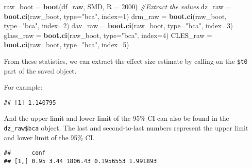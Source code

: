 \documentclass[]{tufte-handout}
\newenvironment{Shaded}{}{}
\newcommand{\CommentTok}[1]{\textcolor[rgb]{0.38,0.63,0.69}{\textit{#1}}}
\newcommand{\DataTypeTok}[1]{\textcolor[rgb]{0.56,0.13,0.00}{#1}}
\newcommand{\DecValTok}[1]{\textcolor[rgb]{0.25,0.63,0.44}{#1}}
\newcommand{\KeywordTok}[1]{\textcolor[rgb]{0.00,0.44,0.13}{\textbf{#1}}}
\newcommand{\NormalTok}[1]{#1}
\newcommand{\OperatorTok}[1]{\textcolor[rgb]{0.40,0.40,0.40}{#1}}
\newcommand{\StringTok}[1]{\textcolor[rgb]{0.25,0.44,0.63}{#1}}
\begin{document}
\begin{Shaded}
\begin{Highlighting}[]
\NormalTok{raw_boot =}\StringTok{ }\KeywordTok{boot}\NormalTok{(df_raw, SMD, }\DataTypeTok{R =} \DecValTok{2000}\NormalTok{)}
\CommentTok{#Extract the values}
\NormalTok{dz_raw =}\StringTok{ }\KeywordTok{boot.ci}\NormalTok{(raw_boot, }\DataTypeTok{type=}\StringTok{"bca"}\NormalTok{, }\DataTypeTok{index=}\DecValTok{1}\NormalTok{)}
\NormalTok{drm_raw =}\StringTok{ }\KeywordTok{boot.ci}\NormalTok{(raw_boot, }\DataTypeTok{type=}\StringTok{"bca"}\NormalTok{, }\DataTypeTok{index=}\DecValTok{2}\NormalTok{)}
\NormalTok{dav_raw =}\StringTok{ }\KeywordTok{boot.ci}\NormalTok{(raw_boot, }\DataTypeTok{type=}\StringTok{"bca"}\NormalTok{, }\DataTypeTok{index=}\DecValTok{3}\NormalTok{)}
\NormalTok{glass_raw =}\StringTok{ }\KeywordTok{boot.ci}\NormalTok{(raw_boot, }\DataTypeTok{type=}\StringTok{"bca"}\NormalTok{, }\DataTypeTok{index=}\DecValTok{4}\NormalTok{)}
\NormalTok{CLES_raw =}\StringTok{ }\KeywordTok{boot.ci}\NormalTok{(raw_boot, }\DataTypeTok{type=}\StringTok{"bca"}\NormalTok{, }\DataTypeTok{index=}\DecValTok{5}\NormalTok{)}
\end{Highlighting}
\end{Shaded}

From these statistics, we can extract the effect size estimate by
calling on the \texttt{\$t0} part of the saved object.

For example:

\begin{Shaded}
\end{Shaded}

\begin{verbatim}
## [1] 1.140795
\end{verbatim}

And the upper limit and lower limit of the 95\% CI can also be found in
the \texttt{dz\_raw\$bca} object. The last and second-to-last numbers
represent the upper limit and lower limit of the 95\% CI.

\begin{Shaded}
\end{Shaded}

\begin{verbatim}
##      conf                                
## [1,] 0.95 3.44 1806.43 0.1956553 1.991893
\end{verbatim}
\end{document}
